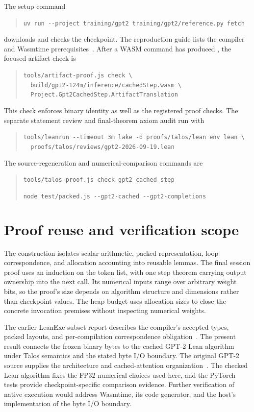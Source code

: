 \documentclass[11pt]{article}
\newcommand{\longcode}[1]{\texttt{\seqsplit{#1}}}
\begin{document}
The setup command
\begin{quote}\small\ttfamily
\verb|uv run --project training/gpt2 training/gpt2/reference.py fetch|
\end{quote}
downloads and checks the checkpoint.  The reproduction guide lists the compiler and Wasmtime prerequisites~\cite{guide}.  After a WASM command has produced \longcode{build/gpt2-124m/inference/cachedStep.wasm}, the focused artifact check is
\begin{quote}\small\ttfamily
\verb|tools/artifact-proof.js check \|\\
\verb|  build/gpt2-124m/inference/cachedStep.wasm \|\\
\verb|  Project.Gpt2CachedStep.ArtifactTranslation|
\end{quote}
This check enforces binary identity as well as the registered proof checks.  The separate statement review and final-theorem axiom audit run with
\begin{quote}\small\ttfamily
\verb|tools/leanrun --timeout 3m lake -d proofs/talos/lean env lean \|\\
\verb|  proofs/talos/reviews/gpt2-2026-09-19.lean|
\end{quote}
The source-regeneration and numerical-comparison commands are
\begin{quote}\small\ttfamily
\verb|tools/talos-proof.js check gpt2_cached_step|

\verb|node test/packed.js --gpt2-cached --gpt2-completions|
\end{quote}

\section{Proof reuse and verification scope}

The construction isolates scalar arithmetic, packed representation, loop correspondence, and allocation accounting into reusable lemmas.  The final session proof uses an induction on the token list, with one step theorem carrying output ownership into the next call.  Its numerical inputs range over arbitrary weight bits, so the proof's size depends on algorithm structure and dimensions rather than checkpoint values.  The heap budget uses allocation sizes to close the concrete invocation premises without inspecting numerical weights.

The earlier LeanExe subset report describes the compiler's accepted types, packed layouts, and per-compilation correspondence obligation~\cite{subset}.  The present result connects the frozen binary bytes to the cached GPT-2 Lean algorithm under Talos semantics and the stated byte I/O boundary.  The original GPT-2 source supplies the architecture and cached-attention organization~\cite{gpt2}.  The checked Lean algorithm fixes the FP32 numerical choices used here, and the PyTorch tests provide checkpoint-specific comparison evidence.  Further verification of native execution would address Wasmtime, its code generator, and the host's implementation of the byte I/O boundary.
\end{document}
